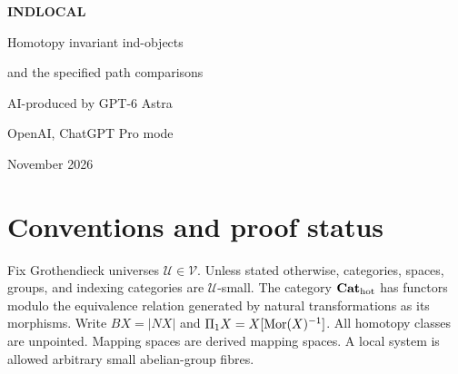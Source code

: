 \documentclass[11pt,a4paper]{article}
\title{INDLOCAL: Homotopy invariant ind-objects\and the specified path comparisons}
\author{AI-produced by GPT-6 Astra\\OpenAI, ChatGPT Pro mode}
\date{14 November 2026}
\theoremstyle{definition}\newtheorem{definition}[theorem]{Definition}
\theoremstyle{remark}\newtheorem{remark}[theorem]{Remark}
\newcommand{\U}{\mathcal U}\newcommand{\V}{\mathcal V}
\begin{document}
\begin{center}
{\LARGE\bfseries INDLOCAL\par}
\medskip
{\Large Homotopy invariant ind-objects\par}
{\Large and the specified path comparisons\par}
\bigskip
AI-produced by GPT-6 Astra\par
OpenAI, ChatGPT Pro mode\par
{} November 2026
\end{center}
\begin{abstract}
This working manuscript records checked proofs, explicit comparisons, and counterexamples for the supplied INDLOCAL problem. The research is in progress. No priority is claimed. Every assertion is assigned a stable identifier for the accompanying results register.
\end{abstract}
\tableofcontents
\section{Conventions and proof status}
Fix Grothendieck universes $\U\in\V$. Unless stated otherwise, categories, spaces, groups, and indexing categories are $\U$-small. The category ${\mathbf{Cat}_{\mathrm{hot}}}$ has functors modulo the equivalence relation generated by natural transformations as its morphisms. Write $BX=|NX|$ and $\Pi_1X=X[\operatorname{Mor}(X)^{-1}]$. All homotopy classes are unpointed. Mapping spaces are derived mapping spaces. A local system is allowed arbitrary small abelian-group fibres.


\end{document}
